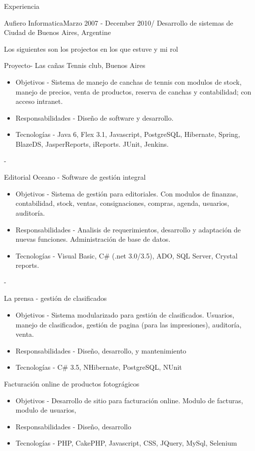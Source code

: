 \documentclass{resume} %
\begin{document}
\begin{rSection}{Experiencia}
\begin{rSubsection}{Aufiero Informatica}{Marzo 2007 - December 2010/ }{Desarrollo de sistemas de  }{Ciudad de Buenos Aires, Argentine}
\item Los siguientes son los projectos en los que estuve y mi rol 
\item Proyecto- Las ca\~nas Tennis club, Buenos Aires
	\begin{itemize}
		\item  Objetivos - Sistema de manejo de canchas de tennis con modulos de stock, manejo de precios, venta de productos, reserva de canchas y contabilidad; con acceso intranet. 
		\item Responsabilidades - Dise\~no de software y desarrollo.
		\item Tecnolog\'ias - Java 6, Flex 3.1, Javascript, PostgreSQL, Hibernate, Spring, BlazeDS, JasperReports, iReports. JUnit, Jenkins.
	\end{itemize} - 
\item Editorial Oceano - Software de gesti\'on integral 
	\begin{itemize}
		\item  Objetivos - Sistema de gesti\'on para editoriales. Con modulos de finanzas, contabilidad, stock, ventas, consignaciones, compras, agenda, usuarios, auditor\'ia.
		\item Responsabilidades - Analisis de requerimientos, desarrollo y adaptaci\'on de nuevas funciones. Administraci\'on de base de datos.
		\item Tecnolog\'ias -  Visual Basic, C\# (.net 3.0/3.5), ADO, SQL Server, Crystal reports.
	\end{itemize} -
\item La prensa - gesti\'on de clasificados
	\begin{itemize}
		\item  Objetivos - Sistema modularizado para gesti\'on de clasificados. Usuarios, manejo de clasificados, gesti\'on de pagina (para las impresiones), auditor\'ia, venta.
		\item Responsabilidades - Dise\~no, desarrollo, y mantenimiento
		\item Tecnolog\'ias -  C\# 3.5, NHibernate, PostgreSQL, NUnit
	\end{itemize} 

\item Facturaci\'on online de productos fotogr\'agicos
	\begin{itemize}
		\item  Objetivos - Desarrollo de sitio para facturaci\'on online. Modulo de facturas, modulo de usuarios,
		\item Responsabilidades -  Dise\~no, desarrollo
		\item Tecnolog\'ias -  PHP, CakePHP, Javascript, CSS, JQuery, MySql, Selenium
	\end{itemize}
 


\end{rSubsection}
\end{rSection}
\end{document}

